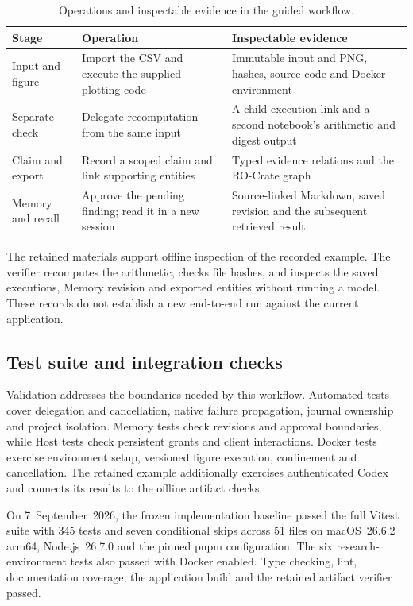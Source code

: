 \documentclass[preprint,12pt,a4paper]{elsarticle}
\begin{document}
\begin{table}[!htbp]
\centering
\caption{Operations and inspectable evidence in the guided workflow.}
\label{tab:reproduction}
\small
\renewcommand{\arraystretch}{1.1}
\begin{tabularx}{\textwidth}{@{}p{}YY@{}}
\toprule
\textbf{Stage} & \textbf{Operation} & \textbf{Inspectable evidence} \\
\midrule
Input and figure & Import the CSV and execute the supplied plotting code & Immutable input and PNG, hashes, source code and Docker environment \\
Separate check & Delegate recomputation from the same input & A child execution link and a second notebook's arithmetic and digest output \\
Claim and export & Record a scoped claim and link supporting entities & Typed evidence relations and the RO-Crate graph \\
Memory and recall & Approve the pending finding; read it in a new session & Source-linked Markdown, saved revision and the subsequent retrieved result \\
\bottomrule
\end{tabularx}
\end{table}
\FloatBarrier

The retained materials support offline inspection of the recorded example. The verifier
recomputes the arithmetic, checks file hashes, and inspects the saved executions, Memory revision
and exported entities without running a model. These records do not establish a new end-to-end
run against the current application.

\subsection{Test suite and integration checks}
\label{sec:tests}

Validation addresses the boundaries needed by this workflow. Automated tests cover delegation
and cancellation, native failure propagation, journal ownership and project isolation.
Memory tests check revisions and approval boundaries, while Host tests check persistent
grants and client interactions. Docker tests exercise environment setup, versioned figure
execution, confinement and cancellation. The retained example additionally exercises
authenticated Codex and connects its results to the offline artifact checks.

On 7~September~2026, the frozen implementation baseline passed the full Vitest suite with
345 tests and seven conditional skips across 51 files on macOS~26.6.2 arm64, Node.js~26.7.0
and the pinned pnpm configuration.
The six research-environment tests also passed with Docker enabled. Type checking, lint,
documentation coverage, the application build and the retained artifact verifier passed.
\end{document}
